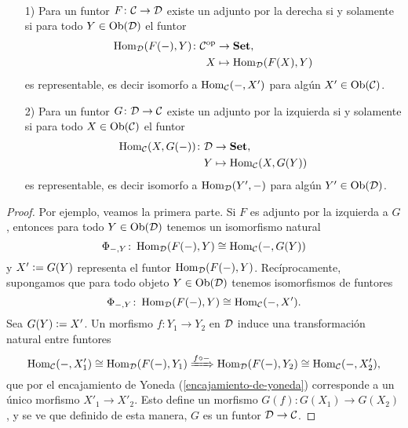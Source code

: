\documentclass{article}
\numberwithin{equation}{section}
\theoremstyle{definition}
\begin{document}
\begin{proposicion}
  \label{representabilidad-y-adjunciones}
  ~

  \begin{enumerate}
  \item[1)] Para un funtor $F\colon \mathcal{C} \to \mathcal{D}$ existe un adjunto
    por la derecha si y solamente si para todo $Y \in \operatorname{Ob} (\mathcal{D})$ el
    funtor
    \begin{align*}
  \operatorname{Hom}_\mathcal{D} (F (-), Y)\colon \mathcal{C}^\mathrm{op} & \to \text{\bf Set},\\
      X & \mapsto \operatorname{Hom}_\mathcal{D} (F (X), Y)
    \end{align*}
    es representable, es decir isomorfo a $\operatorname{Hom}_\mathcal{C} (-, X')$ para algún
    $X'\in \operatorname{Ob} (\mathcal{C})$.

  \item[2)] Para un funtor $G\colon \mathcal{D} \to \mathcal{C}$ existe un adjunto
    por la izquierda si y solamente si para todo $X \in \operatorname{Ob} (\mathcal{C})$ el
    funtor
    \begin{align*}
      \operatorname{Hom}_\mathcal{C} (X, G (-))\colon \mathcal{D} & \to \text{\bf Set},\\
      Y & \mapsto \operatorname{Hom}_\mathcal{C} (X, G (Y))
    \end{align*}
    es representable, es decir isomorfo a $\operatorname{Hom}_\mathcal{D} (Y', -)$ para algún
    $Y'\in \operatorname{Ob} (\mathcal{D})$.
  \end{enumerate}

  \begin{proof}
    Por ejemplo, veamos la primera parte. Si $F$ es adjunto por la izquierda a
    $G$, entonces para todo $Y\in \operatorname{Ob} (\mathcal{D})$ tenemos un isomorfismo
    natural
    $$\Phi_{-,Y}\colon \operatorname{Hom}_\mathcal{D} (F (-), Y) \cong \operatorname{Hom}_\mathcal{C} (-, G(Y))$$
    y $X' \mathrel{\mathop:}= G (Y)$ representa el funtor
    $\operatorname{Hom}_\mathcal{D} (F (-), Y)$. Recíprocamente, supongamos que para todo
    objeto $Y \in \operatorname{Ob} (\mathcal{D})$ tenemos isomorfismos de funtores
    $$\Phi_{-,Y}\colon \operatorname{Hom}_\mathcal{D} (F (-), Y) \cong \operatorname{Hom}_\mathcal{C} (-, X').$$
    Sea $G (Y) \mathrel{\mathop:}= X'$. Un morfismo $f\colon Y_1 \to Y_2$ en $\mathcal{D}$
    induce una transformación natural entre funtores
    \[ \Hom_\vcateg{C} (-, X'_1) \isom \Hom_\vcateg{D} (F (-), Y_1) \xRightarrow{f\circ -}
      \Hom_\vcateg{D} (F (-), Y_2) \isom \Hom_\vcateg{C} (-, X'_2), \]
    que por el encajamiento de Yoneda (\ref{encajamiento-de-yoneda}) corresponde
    a un único morfismo $X'_1 \to X'_2$. Esto define un morfismo
    $G (f)\colon G (X_1) \to G (X_2)$, y se ve que definido de esta manera, $G$
    es un funtor $\mathcal{D} \to \mathcal{C}$.
  \end{proof}
\end{proposicion}
\end{document}
